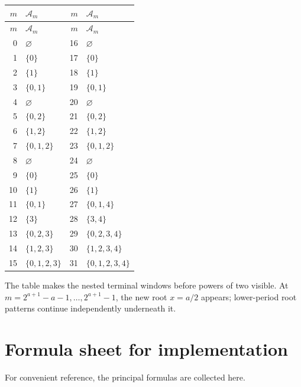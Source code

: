 \documentclass[11pt,a4paper,oneside,openany]{book}
\numberwithin{equation}{chapter}
\theoremstyle{definition}
\theoremstyle{remark}
\begin{document}
\begin{center}
\small
\begin{longtable}{r@{\quad}l|r@{\quad}l}
\toprule
$m$ & $\mathcal A_m$ & $m$ & $\mathcal A_m$\\
\midrule
\endfirsthead
\toprule
$m$ & $\mathcal A_m$ & $m$ & $\mathcal A_m$\\
\midrule
\endhead
0&$\varnothing$&16&$\varnothing$\\
1&$\{0\}$&17&$\{0\}$\\
2&$\{1\}$&18&$\{1\}$\\
3&$\{0,1\}$&19&$\{0,1\}$\\
4&$\varnothing$&20&$\varnothing$\\
5&$\{0,2\}$&21&$\{0,2\}$\\
6&$\{1,2\}$&22&$\{1,2\}$\\
7&$\{0,1,2\}$&23&$\{0,1,2\}$\\
8&$\varnothing$&24&$\varnothing$\\
9&$\{0\}$&25&$\{0\}$\\
10&$\{1\}$&26&$\{1\}$\\
11&$\{0,1\}$&27&$\{0,1,4\}$\\
12&$\{3\}$&28&$\{3,4\}$\\
13&$\{0,2,3\}$&29&$\{0,2,3,4\}$\\
14&$\{1,2,3\}$&30&$\{1,2,3,4\}$\\
15&$\{0,1,2,3\}$&31&$\{0,1,2,3,4\}$\\
\bottomrule
\end{longtable}
\end{center}

The table makes the nested terminal windows before powers of two visible.  At
$m=2^{a+1}-a-1,\ldots,2^{a+1}-1$, the new root $x=a/2$ appears; lower-period
root patterns continue independently underneath it.
\chapter{Formula sheet for implementation}
\label{c:app:formula-sheet}

For convenient reference, the principal formulas are collected here.
\end{document}
